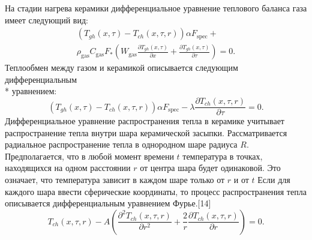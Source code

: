 \documentclass[a4paper,11pt,numreferences,mathsec,kaplist]{isuepsutf8}
\begin{document}
\begin{article}
На стадии нагрева керамики дифференциальное уравнение теплового баланса
газа имеет следующий вид:
\begin{equation}
    \begin{array}{ll}
        \left( T_{gh}(x,\tau) - T_{ch}(x,\tau,r) \right) \alpha F_{\text{spec}}+\\
        \rho_{\text{gas}} C_{\text{gas}} F_{*}
        \left( W_{\text{gas}} \frac{\partial T_{gh} (x, \tau)}{\partial x} + 
        \frac{\partial T_{gh} (x, \tau)}{\partial \tau} \right) = 0.
    \end{array}
    \label{gasheat}
\end{equation}
Теплообмен между газом и керамикой описывается следующим дифференциальным
\\* уравнением: 
\begin{equation}
    \left( T_{gh}(x,\tau) - T_{ch}(x,\tau,r) \right) \alpha F_{\text{spec}}-
    \lambda \frac{\partial T_{ch} (x, \tau, r)}{\partial \tau} = 0.
    \label{surfheat}
\end{equation}
Дифференциальное уравнение распространения тепла в керамике учитывает
распространение тепла внутри шара керамической засыпки. Рассматривается
радиальное распространение тепла в однородном шаре радиуса $R$.
Предполагается, что в любой момент времени $t$ температура в точках,
находящихся на одном расстоянии $r$ от центра шара будет одинаковой. Это
означает, что температура зависит в каждом шаре только от $r$ и от $t$ Если
для каждого шара ввести сферические координаты, то процесс распространения
тепла описывается дифференциальным уравнением Фурье.[14]
\begin{equation}
    T_{ch}(x,\tau,r) - A \left( 
    \frac{ \partial^2 T_{ch}(x,\tau,r)}{\partial r^2} +
    \frac{2}{r} \frac{ \partial T_{ch}(x,\tau,r)}{\partial r} \right) = 0.
    \label{cerheat}
\end{equation}


\end{article}
\end{document}
